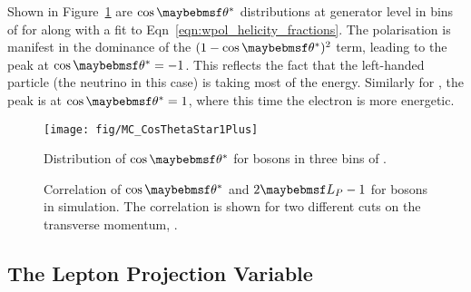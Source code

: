 Shown in Figure~\ref{fig:wpol_costheta} are $\cos\thetastar$ distributions at
generator level in bins of \PtW for \PWp along with a fit to
Eqn~\ref{eqn:wpol_helicity_fractions}. The polarisation is manifest in the
dominance of the $(1-\cos\thetastar)^2$ term, leading to the peak at
$\cos\thetastar = -1$. This reflects the fact that the left-handed particle (the
neutrino in this case) is taking most of the energy. Similarly for \PWm, the
peak is at $\cos\thetastar = 1$, where this time the electron is more energetic.

\begin{figure}
\centering
\texttt{[image: fig/MC\_CosThetaStar1Plus]}
\caption{Distribution of $\cos\thetastar$ for \PWp bosons in three bins of \PtW.}
\label{fig:wpol_costheta}
\end{figure}

\begin{figure}
\centering
{}\quad
\subfloat[[$\PtW > \unit{400}{\GeV}$]{
  \label{fig:wpol_costheta_corr400}\texttt{[image: fig/LP\_corr400]}}\quad
\caption{Correlation of $\cos\thetastar$ and $2\LP - 1$ for \PW bosons in
  simulation. The correlation is shown for two different cuts on the transverse
  momentum, \PtW.}
\label{fig:wpol_costheta_corr}
\end{figure}


\subsection{The Lepton Projection Variable}
\label{sec:wpol_lp}
